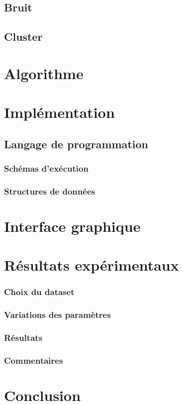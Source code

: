 \subsection{Bruit}
\paragraph{}
\subsection{Cluster}
\paragraph{}

\section{Algorithme}
\paragraph{}
\section{Implémentation}
\subsection{Langage de programmation}
\subsubsection{Schémas d'exécution}
\subsubsection{Structures de données}
\section{Interface graphique}

\section{Résultats expérimentaux}
\subsubsection{Choix du dataset}
\subsubsection{Variations des paramètres}
\subsubsection{Résultats}
\subsubsection{Commentaires}

\section{Conclusion}
